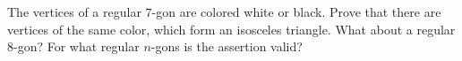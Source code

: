 The vertices of a regular $7$-gon are colored white or black. Prove that there are vertices of the same color, which form an isosceles triangle. What about a regular $8$-gon? For what regular $n$-gons is the assertion valid?
